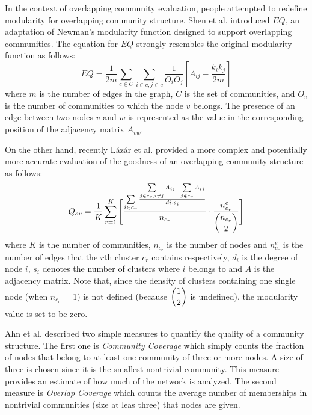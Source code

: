 In the context of overlapping community evaluation, people attempted to redefine modularity for overlapping community structure. Shen et al.
\cite{Shen20091706} introduced $EQ$, an adaptation of Newman's modularity function designed to support overlapping communities. The
equation for $EQ$ strongly resembles the original modularity function as follows:
\begin{equation}
 EQ=\frac{1}{2m}\sum_{c\in C} \sum_{i\in c,j\in c} \frac{1}{O_iO_j} \left[ A_{ij} - \frac{k_ik_j}{2m} \right]
\end{equation}
where $m$ is the number of edges in the graph, $C$ is the set of communities, and $O_v$ is the number of communities to which the node
$v$ belongs. The presence of an edge between two nodes $v$ and $w$ is represented as the value in the corresponding position of the
adjacency matrix $A_{vw}$.

On the other hand, recently L{\'a}z{\'a}r  et al. \cite{Vicsek}  provided a more complex and potentially more accurate evaluation of the
goodness of an overlapping community structure as follows:
\begin{equation}
 Q_{ov}=\frac{1}{K} \sum\limits_{r=1}^{K} \Bigg [  \frac{\sum\limits_{i\in c_r}  \frac{\sum\limits_{j\in c_r, i \neq j} A_{ij} -
\sum\limits_{j \notin c_r} A_{ij}}{di\cdot s_i } }{n_{c_r}} \cdot  \frac{n^e_{c_r}}{	\dbinom{n_{c_r}}{2}}  \Bigg ]
\end{equation}
where $K$ is the number of communities, $n_{c_r}$ is the number of nodes and $n^e_{c_r}$ is the number of edges that the $r$th cluster $c_r$
contains respectively, $d_i$ is the degree of node $i$, $s_i$ denotes the number of clusters where $i$ belongs to and $A$ is the adjacency
matrix. Note that, since the density of clusters containing one single node (when $n_{c_r}$ = 1) is not defined (because $\dbinom{1}{2}$ is
undefined), the modularity value is set to be zero.

 Ahn et al. \cite{nature2010} described two simple measures to quantify the quality of a community
structure. The first one is {\em Community Coverage} which simply counts the fraction of nodes that belong to at least
one community of three or more nodes. A size of three is chosen since it is the smallest nontrivial community. This measure provides an
estimate of how much of the network is analyzed. The second measure is {\em Overlap Coverage} which counts the average number of
memberships in
nontrivial communities (size at leas three) that nodes are given.




